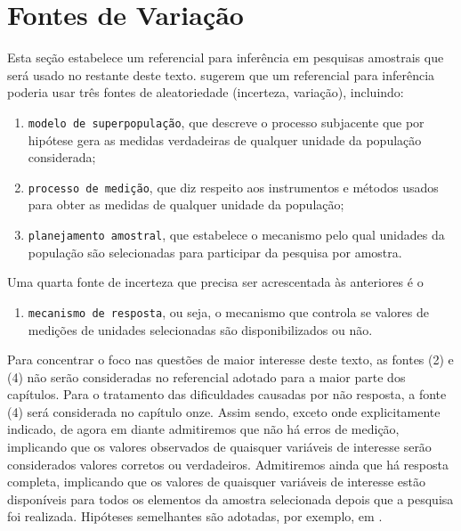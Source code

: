 \documentclass[]{book}
\providecommand{\tightlist}{%
  \setlength{\itemsep}{0pt}\setlength{\parskip}{0pt}}
\theoremstyle{definition}
\theoremstyle{definition}
\theoremstyle{definition}
\theoremstyle{remark}
\begin{document}
\section{Fontes de Variação}\label{fontes-de-variacao}

Esta seção estabelece um referencial para inferência em pesquisas
amostrais que será usado no restante deste texto. \citep{cassel} sugerem
que um referencial para inferência poderia usar três fontes de
aleatoriedade (incerteza, variação), incluindo:

\begin{enumerate}
\def\labelenumi{\arabic{enumi}.}
\item
  \texttt{modelo\ de\ superpopulação}, que descreve o processo
  subjacente que por hipótese gera as medidas verdadeiras de qualquer
  unidade da população considerada;
\item
  \texttt{processo\ de\ medição}, que diz respeito aos instrumentos e
  métodos usados para obter as medidas de qualquer unidade da população;
\item
  \texttt{planejamento\ amostral}, que estabelece o mecanismo pelo qual
  unidades da população são selecionadas para participar da pesquisa por
  amostra.
\end{enumerate}

Uma quarta fonte de incerteza que precisa ser acrescentada às anteriores
é o

\begin{enumerate}
\def\labelenumi{\arabic{enumi}.}
\setcounter{enumi}{3}
\tightlist
\item
  \texttt{mecanismo\ de\ resposta}, ou seja, o mecanismo que controla se
  valores de medições de unidades selecionadas são disponibilizados ou
  não.
\end{enumerate}

Para concentrar o foco nas questões de maior interesse deste texto, as
fontes (2) e (4) não serão consideradas no referencial adotado para a
maior parte dos capítulos. Para o tratamento das dificuldades causadas
por não resposta, a fonte (4) será considerada no capítulo onze. Assim
sendo, exceto onde explicitamente indicado, de agora em diante
admitiremos que não há erros de medição, implicando que os valores
observados de quaisquer variáveis de interesse serão considerados
valores corretos ou verdadeiros. Admitiremos ainda que há resposta
completa, implicando que os valores de quaisquer variáveis de interesse
estão disponíveis para todos os elementos da amostra selecionada depois
que a pesquisa foi realizada. Hipóteses semelhantes são adotadas, por
exemplo, em \citep{Mont87}.
\end{document}
